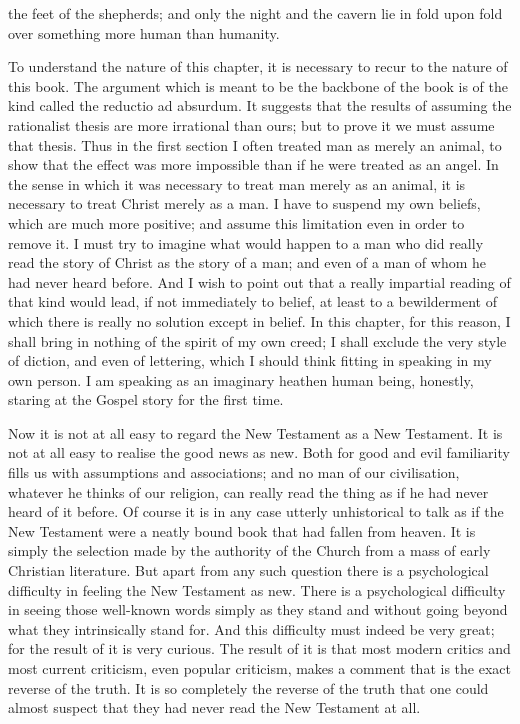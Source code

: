 the feet of the shepherds; and only the night and the cavern lie in fold upon fold over something more human than humanity.


To understand the nature of this chapter, it is necessary to recur to the nature of this book. The argument which is meant to be the backbone of the book is of the kind called the reductio ad absurdum. It suggests that the results of assuming the rationalist thesis are more irrational than ours; but to prove it we must assume that thesis. Thus in the first section I often treated man as merely an animal, to show that the effect was more impossible than if he were treated as an angel. In the sense in which it was necessary to treat man merely as an animal, it is necessary to treat Christ merely as a man. I have to suspend my own beliefs, which are much more positive; and assume this limitation even in order to remove it. I must try to imagine what would happen to a man who did really read the story of Christ as the story of a man; and even of a man of whom he had never heard before. And I wish to point out that a really impartial reading of that kind would lead, if not immediately to belief, at least to a bewilderment of which there is really no solution except in belief. In this chapter, for this reason, I shall bring in nothing of the spirit of my own creed; I shall exclude the very style of diction, and even of lettering, which I should think fitting in speaking in my own person. I am speaking as an imaginary heathen human being, honestly, staring at the Gospel story for the first time.

Now it is not at all easy to regard the New Testament as a New Testament. It is not at all easy to realise the good news as new. Both for good and evil familiarity fills us with assumptions and associations; and no man of our civilisation, whatever he thinks of our religion, can really read the thing as if he had never heard of it before. Of course it is in any case utterly unhistorical to talk as if the New Testament were a neatly bound book that had fallen from heaven. It is simply the selection made by the authority of the Church from a mass of early Christian literature. But apart from any such question there is a psychological difficulty in feeling the New Testament as new. There is a psychological difficulty in seeing those well-known words simply as they stand and without going beyond what they intrinsically stand for. And this difficulty must indeed be very great; for the result of it is very curious. The result of it is that most modern critics and most current criticism, even popular criticism, makes a comment that is the exact reverse of the truth. It is so completely the reverse of the truth that one could almost suspect that they had never read the New Testament at all.

